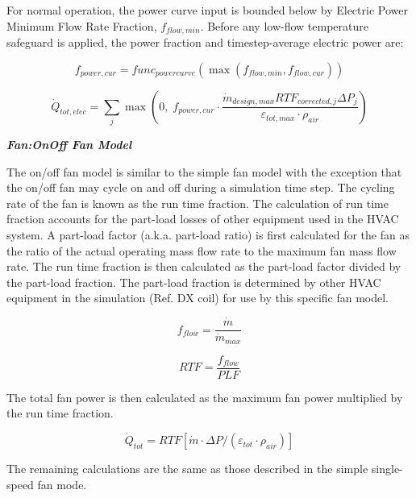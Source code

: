 For normal operation, the power curve input is bounded below by Electric Power Minimum Flow Rate Fraction, \(f_{flow,min}\). Before any low-flow temperature safeguard is applied, the power fraction and timestep-average electric power are:

\begin{equation}
{f_{power,cur}} = {func_{power curve}}\left(\max(f_{flow,min}, f_{flow,cur})\right)
\end{equation}

\begin{equation}
{\dot Q_{tot,elec}} = \sum_j \max\left(0,\; {f_{power,cur}} \cdot \frac{\dot m_{design,max} {RTF_{corrected,j}} {\Delta P_j}}{\varepsilon_{tot,max} \cdot \rho_{air}}\right)
\end{equation}

\emph{\textbf{Fan:OnOff Fan Model}}

The on/off fan model is similar to the simple fan model with the exception that the on/off fan may cycle on and off during a simulation time step. The cycling rate of the fan is known as the run time fraction. The calculation of run time fraction accounts for the part-load losses of other equipment used in the HVAC system. A part-load factor (a.k.a. part-load ratio) is first calculated for the fan as the ratio of the actual operating mass flow rate to the maximum fan mass flow rate. The run time fraction is then calculated as the part-load factor divided by the part-load fraction. The part-load fraction is determined by other HVAC equipment in the simulation (Ref. DX coil) for use by this specific fan model.

\begin{equation}
  f_{flow} = \frac{\dot{m}}{\dot{m}_{max}}
\end{equation}

\begin{equation}
  RTF = \frac{f_{flow}}{PLF}
\end{equation}

The total fan power is then calculated as the maximum fan power multiplied by the run time fraction.

\begin{equation}
{\dot{Q}_{tot}} = RTF\left[ {\dot{m} \cdot \Delta P/\left( {{\varepsilon_{tot}}\cdot {\rho_{air}}} \right)} \right]
\end{equation}

The remaining calculations are the same as those described in the simple single-speed fan mode.

